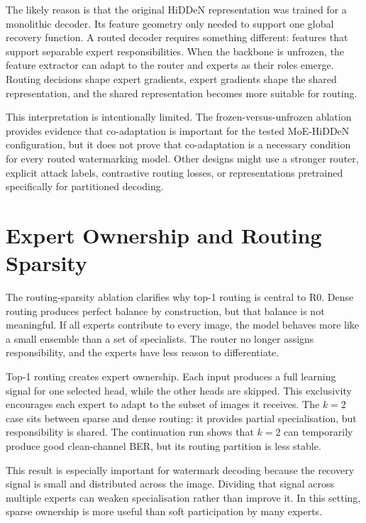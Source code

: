 ﻿\documentclass[12pt, a4paper, twoside]{report}
\numberwithin{equation}{chapter}
\begin{document}
The likely reason is that the original HiDDeN representation was trained for a monolithic decoder. Its feature geometry only needed to support one global recovery function. A routed decoder requires something different: features that support separable expert responsibilities. When the backbone is unfrozen, the feature extractor can adapt to the router and experts as their roles emerge. Routing decisions shape expert gradients, expert gradients shape the shared representation, and the shared representation becomes more suitable for routing.

This interpretation is intentionally limited. The frozen-versus-unfrozen ablation provides evidence that co-adaptation is important for the tested MoE-HiDDeN configuration, but it does not prove that co-adaptation is a necessary condition for every routed watermarking model. Other designs might use a stronger router, explicit attack labels, contrastive routing losses, or representations pretrained specifically for partitioned decoding.

\section{Expert Ownership and Routing Sparsity}

The routing-sparsity ablation clarifies why top-1 routing is central to R0. Dense routing produces perfect balance by construction, but that balance is not meaningful. If all experts contribute to every image, the model behaves more like a small ensemble than a set of specialists. The router no longer assigns responsibility, and the experts have less reason to differentiate.

Top-1 routing creates expert ownership. Each input produces a full learning signal for one selected head, while the other heads are skipped. This exclusivity encourages each expert to adapt to the subset of images it receives. The $k=2$ case sits between sparse and dense routing: it provides partial specialisation, but responsibility is shared. The continuation run shows that $k=2$ can temporarily produce good clean-channel BER, but its routing partition is less stable.

This result is especially important for watermark decoding because the recovery signal is small and distributed across the image. Dividing that signal across multiple experts can weaken specialisation rather than improve it. In this setting, sparse ownership is more useful than soft participation by many experts.
\end{document}
